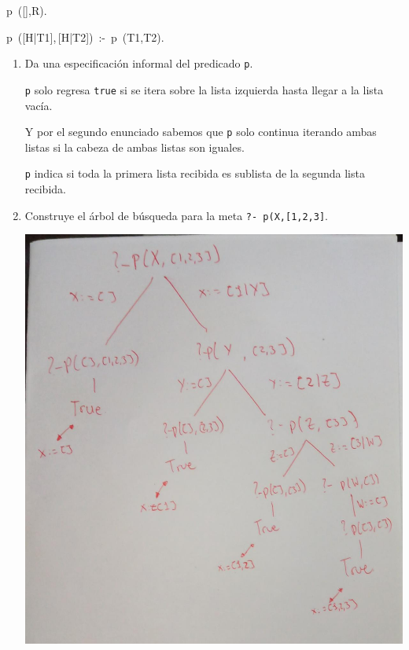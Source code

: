 \documentclass[11pt,letterpaper]{article}
\begin{document}
\begin{enumerate}
  \ttfamily
  p\ ([\;],R).
  
  p\ ([H|T1],\,[H|T2])\ :-\ p\ (T1,T2).
  \rmfamily

  \begin{enumerate}
  \item Da una especificación informal del predicado {\tt p}.

    {\tt p} solo regresa {\tt true} si se itera sobre la lista izquierda
    hasta llegar a la lista vacía.

    Y por el segundo enunciado sabemos que {\tt p} solo continua iterando
    ambas listas si la cabeza de ambas listas son iguales.

    \hfill\break
    {\tt p} indica si toda la primera lista recibida es sublista de la segunda
    lista recibida. 
  \item Construye el árbol de búsqueda para la meta {\tt ?- p(X,[1,2,3]}.

    \begin{center}
      \includegraphics[scale=0.4]{9}
    \end{center}
  \end{enumerate}
\end{enumerate}
\end{document}
